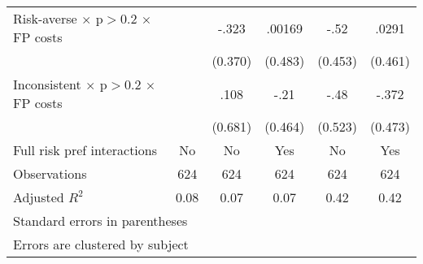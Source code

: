 \begin{table}[htbp]
\begin{tabular}{l*{5}{c}}
Risk-averse $\times$ p$>$0.2 $\times$ FP costs&         &    -.323&   .00169&     -.52&    .0291\\
                &         &  (0.370)&  (0.483)&  (0.453)&  (0.461)\\
Inconsistent $\times$ p$>$0.2 $\times$ FP costs&         &     .108&     -.21&     -.48&    -.372\\
                &         &  (0.681)&  (0.464)&  (0.523)&  (0.473)\\
Full risk pref interactions&       No&       No&      Yes&       No&      Yes\\
\hline
Observations    &      624&      624&      624&      624&      624\\
Adjusted \(R^{2}\)&     0.08&     0.07&     0.07&     0.42&     0.42\\
\hline\hline
\multicolumn{6}{l}{\footnotesize Standard errors in parentheses}\\
\multicolumn{6}{l}{\footnotesize Errors are clustered by subject}\\
\end{tabular}
\end{table}
